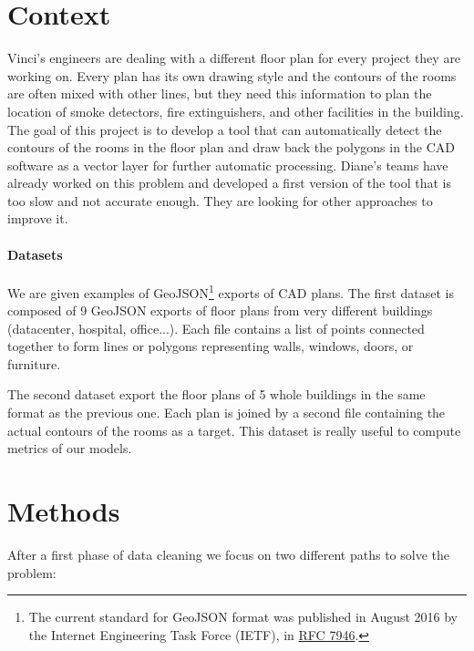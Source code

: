 \documentclass[11pt]{article}
\begin{document}
\section{Context}
Vinci's engineers are dealing with a different floor plan for every project they are working on.
Every plan has its own drawing style and the contours of the rooms are often mixed with other
lines, but they need this information to plan the location of smoke detectors, fire extinguishers,
and other facilities in the building. The goal of this project is to develop a tool that can
automatically detect the contours of the rooms in the floor plan and draw back the polygons in the CAD software as 
a vector layer for further automatic processing. 
Diane's teams have already worked on this problem and developed a first version of the tool
that is too slow and not accurate enough. They are looking for other approaches
to improve it.
\paragraph{Datasets}
We are given examples of GeoJSON\footnote{The current standard for GeoJSON format was 
published in August 2016 by the Internet Engineering Task Force (IETF), 
in \href{https://datatracker.ietf.org/doc/html/rfc7946}{RFC 7946}.} exports of CAD plans. The first dataset is 
composed of 9 GeoJSON exports of floor plans from very different buildings (datacenter, 
hospital, office...). Each file contains a list of points 
connected together to form lines or polygons representing walls, windows, doors, 
or furniture.

The second dataset export the floor plans of 5 whole buildings in the same format
as the previous one. Each plan is joined by a second file 
containing the actual contours of the rooms as a target. This dataset is really useful 
to compute metrics of our models.


\section{Methods}
\label{sec:methods}

After a first phase of data cleaning we focus on two different paths to solve the problem:
\end{document}
